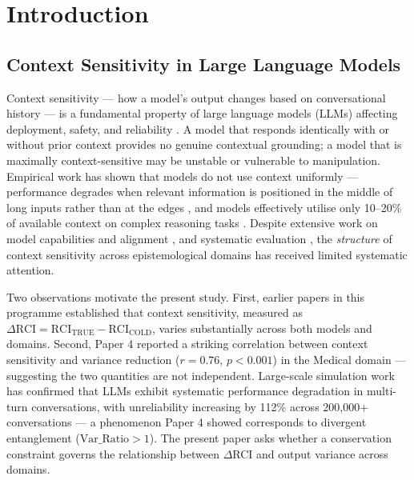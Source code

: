 \documentclass[11pt,a4paper]{article}
\begin{document}
\section{Introduction}

\subsection{Context Sensitivity in Large Language Models}

Context sensitivity --- how a model's output changes based on conversational history ---
is a fundamental property of large language models (LLMs) affecting deployment, safety,
and reliability \citep{liang2023helm,chang2024survey}. A model that responds identically
with or without prior context provides no genuine contextual grounding; a model that is
maximally context-sensitive may be unstable or vulnerable to manipulation. Empirical work
has shown that models do not use context uniformly --- performance degrades when relevant
information is positioned in the middle of long inputs rather than at the edges
\citep{liu2024lost,bai2024longbench,zhang2024infinitebench}, and models effectively
utilise only 10--20\% of available context on complex reasoning tasks
\citep{kuratov2024,hsieh2024ruler,an2025context}. Despite extensive work on model capabilities
\citep{brown2020,kaplan2020,singhal2023,hendrycks2021,chiang2024chatbot} and alignment
\citep{hubinger2019,ouyang2022,bai2022constitutional}, and systematic evaluation
\citep{zheng2023,sclar2024sensitivity}, the \emph{structure}
of context sensitivity across epistemological domains has received limited systematic
attention.

Two observations motivate the present study. First, earlier papers in this programme
\citep{laxman2026a,laxman2026b} established that context sensitivity, measured as
$\Delta\text{RCI} = \text{RCI}_\text{TRUE} - \text{RCI}_\text{COLD}$, varies
substantially across both models and domains. Second, Paper 4 \citep{laxman2026d}
reported a striking correlation between context sensitivity and variance reduction
($r = 0.76$, $p < 0.001$) in the Medical domain --- suggesting the two quantities
are not independent. Large-scale simulation work has confirmed that LLMs exhibit
systematic performance degradation in multi-turn conversations, with unreliability
increasing by 112\% across 200,000+ conversations \citep{laban2025,kwan2024mteval,wang2024mint,maharana2024memory} --- a phenomenon
Paper 4 showed corresponds to divergent entanglement ($\text{Var\_Ratio} > 1$). The
present paper asks whether a conservation constraint governs the relationship between
$\Delta$RCI and output variance across domains.
\end{document}
